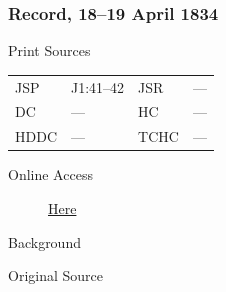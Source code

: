 		\subsubsection{Record, 18--19 April 1834}
			\label{EMS-1834-JS-18-19-APR-1834}
			
			\begin{description}
					\item[Print Sources]
				\end{description}

					\begin{tabular}{p{0.5in}p{1in}p{0.5in}p{1in}}
					JSP	 	& J1:41--42		& JSR 		& --- \\
					DC	 	& --- 		& HC 		& --- \\
					HDDC 	& ---		& TCHC 		& --- \\
					\end{tabular}
				
				\begin{description}
					\item[Online Access] \href{https://www.josephsmithpapers.org/paper-summary/journal-1832-1834/77}{Here}
				\end{description}
				
				\begin{description}
					\item[Background]
				\end{description}
				
				
				\begin{description}
					\item[Original Source]
				\end{description}
				
				
